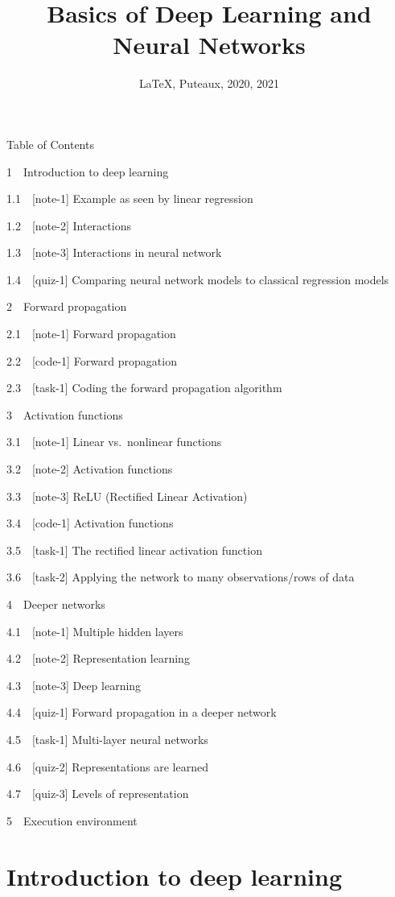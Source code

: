 \documentclass[11pt, twoside]{article}
\date{\LaTeX, Puteaux, 2020, 2021}
\title{Basics of Deep Learning and Neural Networks}
\begin{document}
    
    \maketitle
    
    

    
    Table of Contents{}

{{1~~}Introduction to deep learning}

{{1.1~~}{[}note-1{]} Example as seen by linear regression}

{{1.2~~}{[}note-2{]} Interactions}

{{1.3~~}{[}note-3{]} Interactions in neural network}

{{1.4~~}{[}quiz-1{]} Comparing neural network models to classical
regression models}

{{2~~}Forward propagation}

{{2.1~~}{[}note-1{]} Forward propagation}

{{2.2~~}{[}code-1{]} Forward propagation}

{{2.3~~}{[}task-1{]} Coding the forward propagation algorithm}

{{3~~}Activation functions}

{{3.1~~}{[}note-1{]} Linear vs.~nonlinear functions}

{{3.2~~}{[}note-2{]} Activation functions}

{{3.3~~}{[}note-3{]} ReLU (Rectified Linear Activation)}

{{3.4~~}{[}code-1{]} Activation functions}

{{3.5~~}{[}task-1{]} The rectified linear activation function}

{{3.6~~}{[}task-2{]} Applying the network to many observations/rows of
data}

{{4~~}Deeper networks}

{{4.1~~}{[}note-1{]} Multiple hidden layers}

{{4.2~~}{[}note-2{]} Representation learning}

{{4.3~~}{[}note-3{]} Deep learning}

{{4.4~~}{[}quiz-1{]} Forward propagation in a deeper network}

{{4.5~~}{[}task-1{]} Multi-layer neural networks}

{{4.6~~}{[}quiz-2{]} Representations are learned}

{{4.7~~}{[}quiz-3{]} Levels of representation}

{{5~~}Execution environment}

    \hypertarget{introduction-to-deep-learning}{%
\section{Introduction to deep
learning}\label{introduction-to-deep-learning}}
\end{document}
